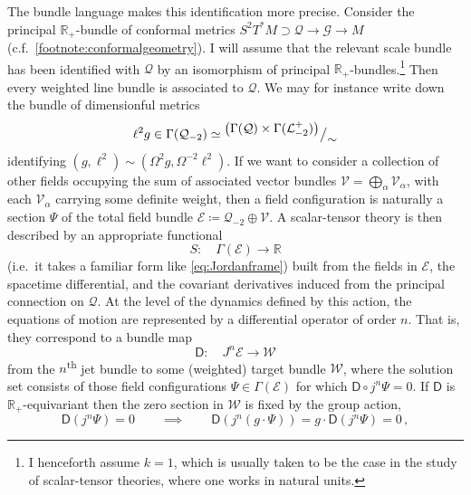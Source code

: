 \documentclass[12pt]{article}
\numberwithin{equation}{section}
\newcommand{\R}{\mathbb{R}}
\begin{document}
The bundle language makes this identification more precise. Consider the principal $\R_+$-bundle of conformal metrics $S^2T^*M\supset \mathcal{Q}\to \mathcal{G}\to M$ (c.f.~\cref{footnote:conformalgeometry}). I will assume that the relevant scale bundle has been identified with $\mathcal{Q}$ by an isomorphism of principal $\R_+$-bundles.\footnote{I henceforth assume $k=1$, which is usually taken to be the case in the study of scalar-tensor theories, where one works in natural units.} Then every weighted line bundle is associated to $\mathcal{Q}$. We may for instance write down the bundle of dimensionful metrics
\begin{equation}
    \ell^2g \in \Gamma(\mathcal{Q}_{-2}) \simeq  {}^{\displaystyle \left(\Gamma(\mathcal{Q})\times \Gamma(\mathcal{L}_{-2}^+)\right)} {\big\slash}_{\displaystyle \sim}
\end{equation}
identifying $(g,\ell^2)\sim (\Omega^2g,\Omega^{-2}\ell^2)$. If we want to consider a collection of other fields occupying the sum of associated vector bundles $\mathcal{V}=\bigoplus_\alpha \mathcal{V}_\alpha$, with each $\mathcal{V}_\alpha$ carrying some definite weight, then a field configuration is naturally a section $\Psi$ of the total field bundle $\mathcal{E}\coloneqq \mathcal{Q}_{-2}\oplus \mathcal{V}$. A scalar-tensor theory is then described by an appropriate functional
\begin{equation}
    S\colon \quad \Gamma(\mathcal{E})\to \R
\end{equation}
(i.e.~it takes a familiar form like \eqref{eq:Jordanframe}) built from the fields in $\mathcal{E}$, the spacetime differential, and the covariant derivatives induced from the principal connection on $\mathcal{Q}$. At the level of the dynamics defined by this action, the equations of motion are represented by a differential operator of order $n$. That is, they correspond to a bundle map
\begin{equation}
    \mathsf{D}\colon\quad J^n\mathcal{E}\to \mathcal{W}
\end{equation}
from the $n$\textsuperscript{th} jet bundle to some (weighted) target bundle $\mathcal{W}$, where the solution set consists of those field configurations $\Psi\in \Gamma(\mathcal{E})$ for which ${\mathsf{D}\circ j^n\Psi = 0}$. If $\mathsf{D}$ is $\R_+$-equivariant then the zero section in $\mathcal{W}$ is fixed by the group action,
\begin{equation}\label{eq:equivariantD}
    \mathsf{D}(j^n\Psi) = 0\qquad \implies \qquad \mathsf{D}(j^n(g\cdot \Psi)) = g\cdot \mathsf{D}(j^n\Psi) = 0\,,
\end{equation}
\end{document}
